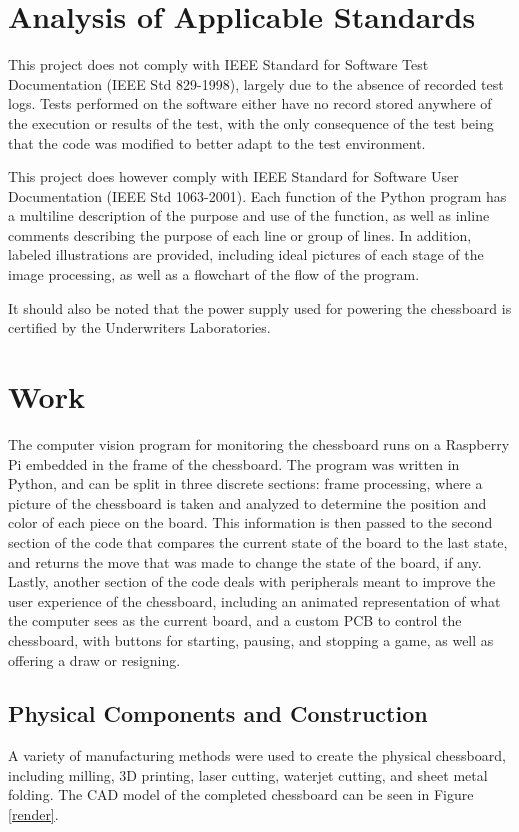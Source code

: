 \documentclass[journal]{IEEEtran}
\begin{document}
\section{Analysis of Applicable Standards}
This project does not comply with IEEE Standard for Software Test Documentation (IEEE Std 829-1998), largely due to the absence of recorded test logs. Tests performed on the software either have no record stored anywhere of the execution or results of the test, with the only consequence of the test being that the code was modified to better adapt to the test environment.

This project does however comply with IEEE Standard for Software User Documentation (IEEE Std 1063-2001). Each function of the Python program has a multiline description of the purpose and use of the function, as well as inline comments describing the purpose of each line or group of lines. In addition, labeled illustrations are provided, including ideal pictures of each stage of the image processing, as well as a flowchart of the flow of the program.

It should also be noted that the power supply used for powering the chessboard is certified by the Underwriters Laboratories.

\section{Work}
The computer vision program for monitoring the chessboard runs on a Raspberry Pi embedded in the frame of the chessboard. The program was written in Python, and can be split in three discrete sections: frame processing, where a picture of the chessboard is taken and analyzed to determine the position and color of each piece on the board. This information is then passed to the second section of the code that compares the current state of the board to the last state, and returns the move that was made to change the state of the board, if any. Lastly, another section of the code deals with peripherals meant to improve the user experience of the chessboard, including an animated representation of what the computer sees as the current board, and a custom PCB to control the chessboard, with buttons for starting, pausing, and stopping a game, as well as offering a draw or resigning.

\subsection{Physical Components and Construction}
A variety of manufacturing methods were used to create the physical chessboard, including milling, 3D printing, laser cutting, waterjet cutting, and sheet metal folding. The CAD model of the completed chessboard can be seen in Figure \ref{render}.
\end{document}
